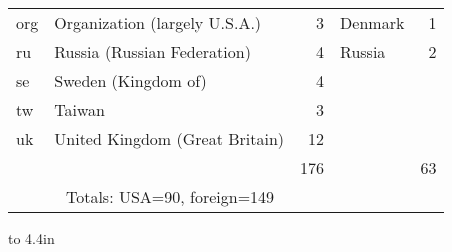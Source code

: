 \begin{center}
\begin{tabular}{|llr|lr|}
org & Organization (largely U.S.A.) &  3 & Denmark        &  1  \\
ru  & Russia (Russian Federation)   &  4 & Russia         &  2  \\
se  & Sweden (Kingdom of)           &  4 &                &     \\
tw  & Taiwan                        &  3 &                &     \\
uk  & United Kingdom (Great Britain)& 12 &                &     \\
\hline
    &                              & 176 &                & 63  \\
\multicolumn{3}{|c|}{Totals: USA=90, foreign=149}& &  \\
\hline\hline
\end{tabular}
\end{center}

\vfill
\eject

 \cleardoublepage\pagestyle{empty}
 \centerline{\hss{}\hss}
 \vfill\eject
 \vbox to 4.4in{
 \vfill
 \vfill}
 \phantom{...}
 \centerline{\hss{}\hss}


